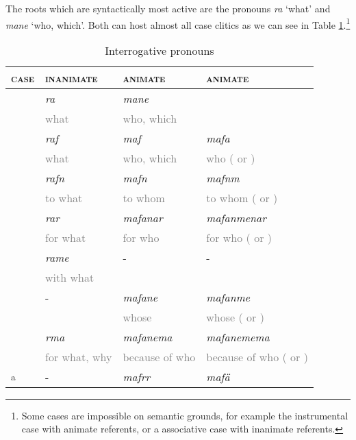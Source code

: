The roots which are syntactically most active are the  pronouns \emph{ra} `what' and \emph{mane} `who, which'. Both can host almost all case clitics as we can see in Table \ref{interrog}.\footnote{Some cases are impossible on semantic grounds, for example the instrumental case with animate referents, or a associative case with inanimate referents.}

\begin{table}
\caption{Interrogative pronouns}
\label{interrog}
	\begin{tabular}{llll}
		\lsptoprule
		\textsc{case} & \textsc{inanimate} & \textsc{animate} \Sg & \textsc{animate} \Nsg\\\midrule
		\Abs & \emph{ra}&\multicolumn{2}{|l|}{\hspace{2cm}\emph{mane}}\\
		&\textcolor{gray}{\footnotesize what} &\multicolumn{2}{|l|}{\hspace{2cm}\textcolor{gray}{\footnotesize who, which}}\\\cline{3-4}
		\Erg{} &\emph{raf}&\emph{maf} &\emph{mafa}\\
		& \textcolor{gray}{\footnotesize what} &\textcolor{gray}{\footnotesize who, which} &\textcolor{gray}{\footnotesize who (\Du{} or \Pl{})}\\
		\Dat &\emph{rafn}&\emph{mafn} &\emph{mafnm}\\
		&\textcolor{gray}{\footnotesize to what} &\textcolor{gray}{\footnotesize to whom} &\textcolor{gray}{\footnotesize to whom (\Du{} or \Pl{})}\\
		\Purp &\emph{rar}&\emph{mafanar} &\emph{mafanmenar}\\
		&\textcolor{gray}{\footnotesize for what} &\textcolor{gray}{\footnotesize for who} &\textcolor{gray}{\footnotesize for who (\Du{} or \Pl{})}\\
		\Ins &\emph{rame}&-&-\\
		&\textcolor{gray}{\footnotesize with what}&&\\
		\Poss &- &\emph{mafane} &\emph{mafanme}\\
		& &\textcolor{gray}{\footnotesize whose} &\textcolor{gray}{\footnotesize whose (\Du{} or \Pl{})}\\
		\Char &\emph{rma} &\emph{mafanema} &\emph{mafanemema}\\
		&\textcolor{gray}{\footnotesize for what, why}&\textcolor{gray}{\footnotesize because of who}&\textcolor{gray}{\footnotesize because of who (\Du{} or \Pl{})}\\
		\Assoc\textsuperscript{a} &- &\emph{mafrr} &\emph{mafä}\\

\end{tabular}
\end{table}
